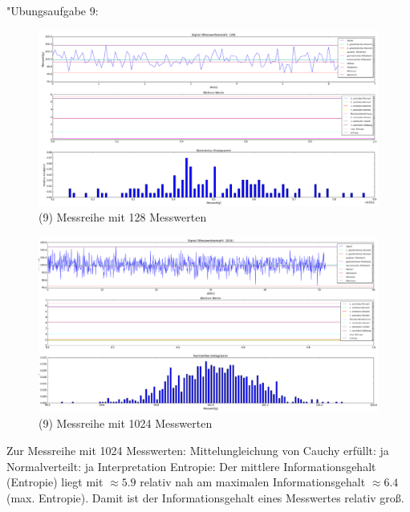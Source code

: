 

	"Ubungsaufgabe 9: \newline
	\begin{figure}
		\includegraphics[width=1.0\textwidth]{A09_128.png}
		\caption{(9) Messreihe mit 128 Messwerten}
	\end{figure}
	\begin{figure}
		\includegraphics[width=1.0\textwidth]{A09_1024.png}
		\caption{(9) Messreihe mit 1024 Messwerten}
	\end{figure}
	Zur Messreihe mit 1024 Messwerten: \newline
	Mittelungleichung von Cauchy erfüllt: ja \newline
	Normalverteilt: ja \newline
	Interpretation Entropie: Der mittlere Informationsgehalt (Entropie) liegt mit $\approx 5.9$ relativ nah am maximalen Informationsgehalt $\approx 6.4$ (max. Entropie).
	Damit ist der Informationsgehalt eines Messwertes relativ groß.
